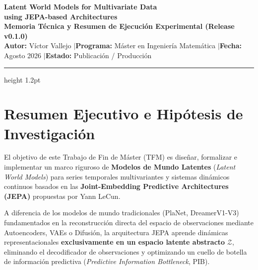 \documentclass[10pt,a4paper]{article}
\begin{document}
\begin{center}
    {\LARGE\bfseries\color{navyblue} Latent World Models for Multivariate Data\\ using JEPA-based Architectures}\\[0.4em]
    {\large\bfseries\color{slateblue} Memoria Técnica y Resumen de Ejecución Experimental (Release v0.1.0)}\\[0.3em]
    {\footnotesize\textbf{Autor:} Víctor Vallejo \quad$\vert$\quad \textbf{Programa:} Máster en Ingeniería Matemática \quad$\vert$\quad \textbf{Fecha:} Agosto 2026 \quad$\vert$\quad \textbf{Estado:} Publicación / Producción}
\end{center}
\vspace{-0.6em}
\hrule height 1.2pt \color{navyblue}
\vspace{0.6em}

\section{Resumen Ejecutivo e Hipótesis de Investigación}

El objetivo de este Trabajo de Fin de Máster (TFM) es diseñar, formalizar e implementar un marco riguroso de \textbf{Modelos de Mundo Latentes} (\textit{Latent World Models}) para series temporales multivariantes y sistemas dinámicos continuos basados en las \textbf{Joint-Embedding Predictive Architectures (JEPA)} propuestas por Yann LeCun. 

A diferencia de los modelos de mundo tradicionales (PlaNet, DreamerV1-V3) fundamentados en la reconstrucción directa del espacio de observaciones mediante Autoencoders, VAEs o Difusión, la arquitectura JEPA aprende dinámicas representacionales \textbf{exclusivamente en un espacio latente abstracto} $\mathcal{Z}$, eliminando el decodificador de observaciones y optimizando un cuello de botella de información predictiva (\textit{Predictive Information Bottleneck}, PIB).
\end{document}
